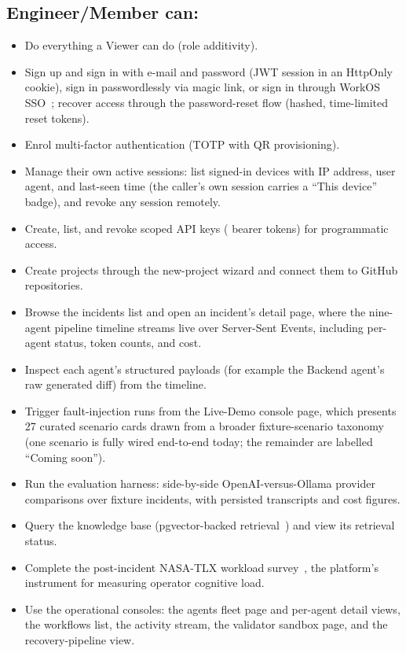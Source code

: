 \subsection{Engineer/Member can:}

\begin{itemize}[nosep]
  \item Do everything a Viewer can do (role additivity).
  \item Sign up and sign in with e-mail and password (JWT session in an
        HttpOnly cookie), sign in passwordlessly via magic link, or sign in
        through WorkOS SSO~\cite{workos}; recover access through the
        password-reset flow (hashed, time-limited reset tokens).
  \item Enrol multi-factor authentication (TOTP with QR provisioning).
  \item Manage their own active sessions: list signed-in devices with IP
        address, user agent, and last-seen time (the caller's own session
        carries a ``This device'' badge), and revoke any session remotely.
  \item Create, list, and revoke scoped API keys (
        bearer tokens) for programmatic access.
  \item Create projects through the new-project wizard and connect them to
        GitHub repositories.
  \item Browse the incidents list and open an incident's detail page, where
        the nine-agent pipeline timeline streams live over Server-Sent
        Events, including per-agent status, token counts, and cost.
  \item Inspect each agent's structured payloads (for example the Backend
        agent's raw generated diff) from the timeline.
  \item Trigger fault-injection runs from the Live-Demo console page, which
        presents 27 curated scenario cards drawn from a broader
        fixture-scenario taxonomy (one scenario is fully wired end-to-end
        today; the remainder are labelled ``Coming soon'').
  \item Run the evaluation harness: side-by-side OpenAI-versus-Ollama
        provider comparisons over fixture incidents, with persisted
        transcripts and cost figures.
  \item Query the knowledge base (pgvector-backed retrieval~\cite{pgvector})
        and view its retrieval status.
  \item Complete the post-incident NASA-TLX workload survey~\cite{nasatlx},
        the platform's instrument for measuring operator cognitive load.
  \item Use the operational consoles: the agents fleet page and per-agent
        detail views, the workflows list, the activity stream, the validator
        sandbox page, and the recovery-pipeline view.
\end{itemize}

